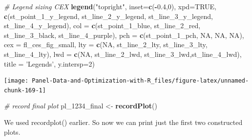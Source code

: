 \documentclass[
]{book}
\newenvironment{Shaded}{\begin{snugshade}}{\end{snugshade}}
\newcommand{\CommentTok}[1]{\textcolor[rgb]{0.56,0.35,0.01}{\textit{#1}}}
\newcommand{\DataTypeTok}[1]{\textcolor[rgb]{0.13,0.29,0.53}{#1}}
\newcommand{\DecValTok}[1]{\textcolor[rgb]{0.00,0.00,0.81}{#1}}
\newcommand{\FloatTok}[1]{\textcolor[rgb]{0.00,0.00,0.81}{#1}}
\newcommand{\KeywordTok}[1]{\textcolor[rgb]{0.13,0.29,0.53}{\textbf{#1}}}
\newcommand{\NormalTok}[1]{#1}
\newcommand{\OperatorTok}[1]{\textcolor[rgb]{0.81,0.36,0.00}{\textbf{#1}}}
\newcommand{\OtherTok}[1]{\textcolor[rgb]{0.56,0.35,0.01}{#1}}
\newcommand{\StringTok}[1]{\textcolor[rgb]{0.31,0.60,0.02}{#1}}
\begin{document}
\begin{Shaded}
\begin{Highlighting}[]
\CommentTok{# Legend sizing CEX}
\KeywordTok{legend}\NormalTok{(}\StringTok{"topright"}\NormalTok{,}
       \DataTypeTok{inset=}\KeywordTok{c}\NormalTok{(}\OperatorTok{-}\FloatTok{0.4}\NormalTok{,}\DecValTok{0}\NormalTok{),}
       \DataTypeTok{xpd=}\OtherTok{TRUE}\NormalTok{,}
       \KeywordTok{c}\NormalTok{(st_point_}\DecValTok{1}\NormalTok{_y_legend, st_line_}\DecValTok{2}\NormalTok{_y_legend, st_line_}\DecValTok{3}\NormalTok{_y_legend, st_line_}\DecValTok{4}\NormalTok{_y_legend),}
       \DataTypeTok{col =} \KeywordTok{c}\NormalTok{(st_point_}\DecValTok{1}\NormalTok{_blue, st_line_}\DecValTok{2}\NormalTok{_red, st_line_}\DecValTok{3}\NormalTok{_black, st_line_}\DecValTok{4}\NormalTok{_purple),}
       \DataTypeTok{pch =} \KeywordTok{c}\NormalTok{(st_point_}\DecValTok{1}\NormalTok{_pch, }\OtherTok{NA}\NormalTok{, }\OtherTok{NA}\NormalTok{, }\OtherTok{NA}\NormalTok{),}
       \DataTypeTok{cex =}\NormalTok{ fl_ces_fig_small,}
       \DataTypeTok{lty =} \KeywordTok{c}\NormalTok{(}\OtherTok{NA}\NormalTok{, st_line_}\DecValTok{2}\NormalTok{_lty, st_line_}\DecValTok{3}\NormalTok{_lty, st_line_}\DecValTok{4}\NormalTok{_lty),}
       \DataTypeTok{lwd =} \KeywordTok{c}\NormalTok{(}\OtherTok{NA}\NormalTok{, st_line_}\DecValTok{2}\NormalTok{_lwd, st_line_}\DecValTok{3}\NormalTok{_lwd,st_line_}\DecValTok{4}\NormalTok{_lwd),}
       \DataTypeTok{title =} \StringTok{'Legends'}\NormalTok{,}
       \DataTypeTok{y.intersp=}\DecValTok{2}\NormalTok{)}
\end{Highlighting}
\end{Shaded}

\begin{center}\texttt{[image: Panel-Data-and-Optimization-with-R\_files/figure-latex/unnamed-chunk-169-1]} \end{center}

\begin{Shaded}
\begin{Highlighting}[]
\CommentTok{# record final plot}
\NormalTok{pl_}\DecValTok{1234}\NormalTok{_final <-}\StringTok{ }\KeywordTok{recordPlot}\NormalTok{()}
\end{Highlighting}
\end{Shaded}

We used recordplot() earlier. So now we can print just the first two constructed plots.
\end{document}
